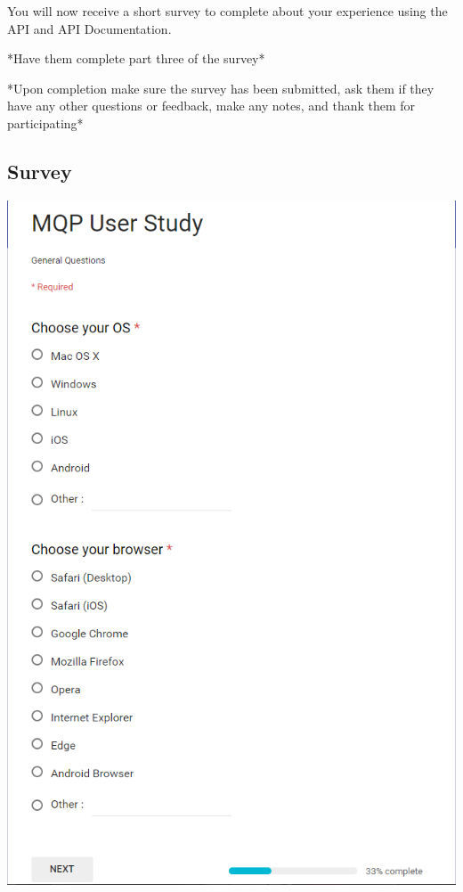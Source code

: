 You will now receive a short survey to complete about your experience using the API and API Documentation.

*Have them complete part three of the survey*

*Upon completion make sure the survey has been submitted, ask them if they have any other questions or feedback, make any notes, and thank them for participating*

\subsection{Survey}

\begin{center}
\includegraphics[width=0.9\linewidth]{images/survey1}
\end{center}

